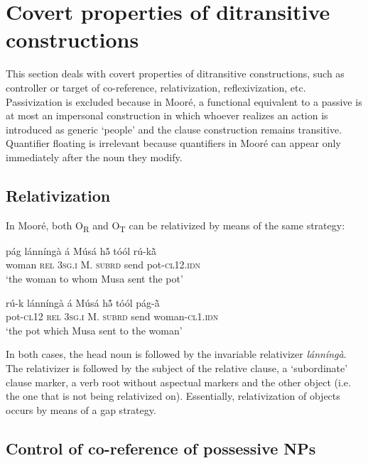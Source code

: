 \documentclass[output=paper]{langsci/langscibook}
\begin{document}
\section{Covert properties of ditransitive constructions}\label{§5:covert.pacchiarotti}

This section deals with covert properties of ditransitive constructions, such as controller or target of co-reference, relativization, reflexivization, etc. Passivization is excluded because in Mooré, a functional equivalent to a passive is at most an impersonal construction in which whoever realizes an action is introduced as generic `people' and the clause construction remains transitive. Quantifier floating is irrelevant because quantifiers in Mooré can appear only immediately after the noun they modify. 

\subsection{Relativization}\label{§5.1:relativization.pacchiarotti}

In Mooré, both O\textsubscript{R}  and O\textsubscript{T}  can be relativized by means of the same strategy:

\ea
\label{ex:33.pacchiarotti}
\gll pág    lánníngà  á    Músá  hə̃́    tóól  rú-k\`{ã}\\
woman  \textsc{rel}    \textsc{3sg.i}    M.  \textsc{subrd}    send  pot-\textsc{cl12.idn}\\
\glt `the woman to whom Musa sent the pot'
\z

\ea
\label{ex:34.pacchiarotti}
\gll rú-k    lánníngà  á    Músá  hə̃́    tóól  pág-\`{ã}\\
pot-\textsc{cl12}  \textsc{rel}    \textsc{3sg.i}    M.  \textsc{subrd}    send  woman-\textsc{cl1.idn}\\
\glt `the pot which Musa sent to the woman'
\z

In both cases, the head noun is followed by the invariable relativizer \textit{lánníngà}. The relativizer is followed by the subject of the relative clause, a `subordinate' clause marker, a verb root without aspectual markers and the other object (i.e. the one that is not being relativized on). Essentially, relativization of objects occurs by means of a gap strategy. 

\subsection{Control of co-reference of possessive NPs}\label{§5.2:Control.pacchiarotti}
\end{document}
